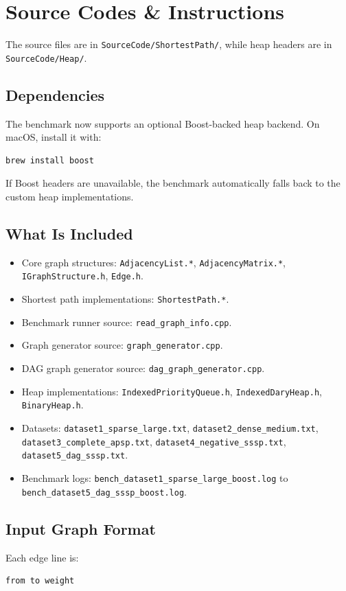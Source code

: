\section{Source Codes \& Instructions}

The source files are in \texttt{SourceCode/ShortestPath/}, while heap headers are in \texttt{SourceCode/Heap/}.

\subsection{Dependencies}
The benchmark now supports an optional Boost-backed heap backend. On macOS, install it with:
\begin{verbatim}
brew install boost
\end{verbatim}

If Boost headers are unavailable, the benchmark automatically falls back to the custom heap implementations.

\subsection{What Is Included}
\begin{itemize}
	\item Core graph structures: \texttt{AdjacencyList.*}, \texttt{AdjacencyMatrix.*}, \texttt{IGraphStructure.h}, \texttt{Edge.h}.
	\item Shortest path implementations: \texttt{ShortestPath.*}.
	\item Benchmark runner source: \texttt{read\_graph\_info.cpp}.
	\item Graph generator source: \texttt{graph\_generator.cpp}.
  \item DAG graph generator source: \texttt{dag\_graph\_generator.cpp}.
	\item Heap implementations: \texttt{IndexedPriorityQueue.h}, \texttt{IndexedDaryHeap.h}, \texttt{BinaryHeap.h}.
  \item Datasets: \texttt{dataset1\_sparse\_large.txt}, \texttt{dataset2\_dense\_medium.txt}, \texttt{dataset3\_complete\_apsp.txt}, \texttt{dataset4\_negative\_sssp.txt}, \texttt{dataset5\_dag\_sssp.txt}.
  \item Benchmark logs: \texttt{bench\_dataset1\_sparse\_large\_boost.log} to \texttt{bench\_dataset5\_dag\_sssp\_boost.log}.
\end{itemize}

\subsection{Input Graph Format}
Each edge line is:
\begin{verbatim}
from to weight
\end{verbatim}

